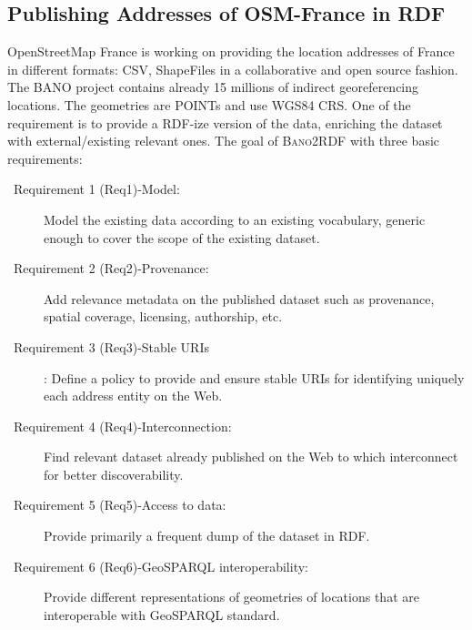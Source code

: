\subsection{Publishing Addresses of OSM-France in RDF}
\label{sec:bano2rdf}
OpenStreetMap France is working on providing the location addresses of France in different formats: CSV, ShapeFiles in a collaborative and open source fashion. The BANO project contains already 15 millions of indirect georeferencing locations. The geometries are POINTs and use WGS84 CRS. One of the requirement is to provide a RDF-ize version of the data, enriching the dataset with external/existing relevant ones. The goal of \textsc{Bano2RDF} with three basic requirements:
\begin{description}
\item [~Requirement 1 (Req1)-Model:] Model the existing data according to an existing vocabulary, generic enough to cover the scope of the existing dataset.
\item[~Requirement 2 (Req2)-Provenance:] Add relevance metadata on the published dataset  such as provenance, spatial coverage, licensing, authorship, etc.
\item[~Requirement 3 (Req3)-Stable URIs]: Define a policy to provide and ensure stable URIs for identifying uniquely each address entity on the Web.
\item[~Requirement 4 (Req4)-Interconnection:] Find relevant dataset already published on the Web to which interconnect for better discoverability.

\item[~Requirement 5 (Req5)-Access to data:] Provide primarily a frequent dump of the dataset in RDF.

\item[~Requirement 6 (Req6)-GeoSPARQL interoperability:] Provide different representations of geometries of locations that are interoperable with GeoSPARQL standard.

\end{description}


